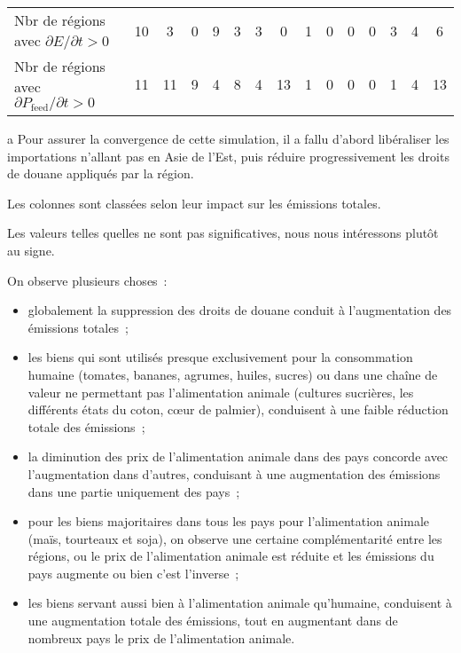 \begin{table}[hbt!]
{\begin{tabular}{l|cccc|ccccccc|ccc}
            Nbr de régions avec $\partial E/\partial t >0$               & 10              & 3               & 0       & 9       & 3       & 3       & 0            & 1       & 0     & 0     & 0     & 3                 & 4       & 6       \\
            Nbr de régions avec $\partial P_\text{feed}/ \partial t > 0$ & 11              & 11              & 9       & 4       & 8       & 4       & 13           & 1       & 0     & 0     & 0     & 1                 & 4       & 13
        \end{tabular}%
    }
    \begin{tablenotes}
        \item [a] Pour assurer la convergence de cette simulation, il a fallu d'abord libéraliser les importations n'allant pas en Asie de l'Est, puis réduire progressivement les droits de douane appliqués par la région.
        \item Les colonnes sont classées selon leur impact sur les émissions totales.
        \item Les valeurs telles quelles ne sont pas significatives, nous nous intéressons plutôt au signe.
    \end{tablenotes}
\end{table}

On observe plusieurs choses~:
\begin{itemize}
    \item globalement la suppression des droits de douane conduit à l'augmentation des émissions totales~;
    \item les biens qui sont utilisés presque exclusivement pour la consommation humaine (tomates, bananes, agrumes, huiles, sucres) ou dans une chaîne de valeur ne permettant pas l'alimentation animale (cultures sucrières, les différents états du coton, cœur de palmier), conduisent à une faible réduction totale des émissions~;
    \item la diminution des prix de l'alimentation animale dans des pays concorde avec l'augmentation dans d'autres, conduisant à une augmentation des émissions dans une partie uniquement des pays~;
    \item pour les biens majoritaires dans tous les pays pour l'alimentation animale (maïs, tourteaux et soja), on observe une certaine complémentarité entre les régions, ou le prix de l'alimentation animale est réduite et les émissions du pays augmente ou bien c'est l'inverse~;
    \item les biens servant aussi bien à l'alimentation animale qu'humaine, conduisent à une augmentation totale des émissions, tout en augmentant dans de nombreux pays le prix de l'alimentation animale.
\end{itemize}

